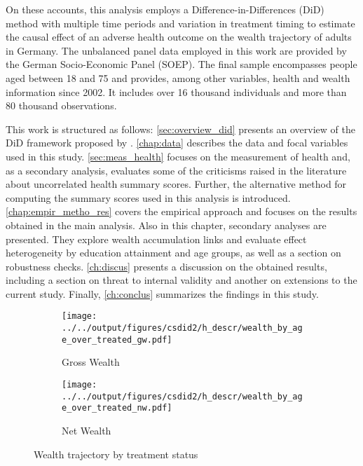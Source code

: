 On these accounts, this analysis employs a Difference-in-Differences (DiD) method with multiple time periods and
variation in treatment timing to estimate the causal effect of an adverse health outcome on the wealth trajectory
of adults in Germany. The unbalanced panel data employed in this work are provided by the German Socio-Economic
Panel (SOEP). The final sample encompasses people aged between 18 and 75 and provides, among other variables, health and wealth 
information since 2002. It includes over 16 thousand individuals and more than 80 thousand observations.


This work is structured as follows: \cref{sec:overview_did} presents an overview of the DiD framework proposed by
\textcite{cs2021did_mtp}. \cref{chap:data} describes the data and focal variables used in this study.
\cref{sec:meas_health} focuses on the measurement of health and, as a secondary analysis, evaluates some of the
criticisms raised in the literature about uncorrelated health summary scores. Further, the alternative method for
computing the summary scores used in this analysis is introduced. \cref{chap:empir_metho_res} covers the empirical
approach and focuses on the results obtained in the main analysis. Also in this chapter, secondary analyses are
presented. They explore wealth accumulation links and evaluate effect heterogeneity by education attainment and age
groups, as well as a section on robustness checks. \cref{ch:discus} presents a discussion on the obtained results,
including a section on threat to internal validity and another on extensions to the current study. Finally,
\cref{ch:conclus} summarizes the findings in this study.




\begin{figure}[t]
    \centering
    \begin{subfigure}{.45\textwidth}
        \centering
        \caption*{\small Gross Wealth}
        \texttt{[image: ../../output/figures/csdid2/h\_descr/wealth\_by\_age\_over\_treated\_gw.pdf]}
    \end{subfigure}
    \begin{subfigure}{.45\textwidth}
        \centering
        \caption*{\small Net Wealth}
        \texttt{[image: ../../output/figures/csdid2/h\_descr/wealth\_by\_age\_over\_treated\_nw.pdf]}
    \end{subfigure}
    \caption{Wealth trajectory by treatment status}
    \label{fig:wealthbyageovertreated}
\end{figure}





